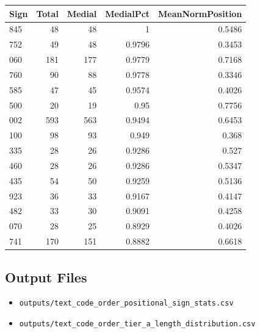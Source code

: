 ﻿\documentclass[11pt,a4paper]{article}
\begin{document}
\begin{center}
\begin{tabular}{lrrrr}
\toprule
\textbf{Sign} & \textbf{Total} & \textbf{Medial} & \textbf{MedialPct} & \textbf{MeanNormPosition} \\
\midrule
845 & 48 & 48 & 1 & 0.5486 \\
752 & 49 & 48 & 0.9796 & 0.3453 \\
060 & 181 & 177 & 0.9779 & 0.7168 \\
760 & 90 & 88 & 0.9778 & 0.3346 \\
585 & 47 & 45 & 0.9574 & 0.4026 \\
500 & 20 & 19 & 0.95 & 0.7756 \\
002 & 593 & 563 & 0.9494 & 0.6453 \\
100 & 98 & 93 & 0.949 & 0.368 \\
335 & 28 & 26 & 0.9286 & 0.527 \\
460 & 28 & 26 & 0.9286 & 0.5347 \\
435 & 54 & 50 & 0.9259 & 0.5136 \\
923 & 36 & 33 & 0.9167 & 0.4147 \\
482 & 33 & 30 & 0.9091 & 0.4258 \\
070 & 28 & 25 & 0.8929 & 0.4026 \\
741 & 170 & 151 & 0.8882 & 0.6618 \\
\bottomrule
\end{tabular}
\end{center}

\subsection*{Output Files}

\begin{itemize}
\item \texttt{outputs/text\_code\_order\_positional\_sign\_stats.csv}
\item \texttt{outputs/text\_code\_order\_tier\_a\_length\_distribution.csv}
\end{itemize}
\end{document}
